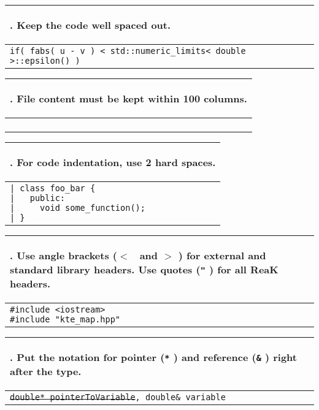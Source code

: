 \documentclass[10pt]{article}
\newcommand{\code}[1]{\color[rgb]{0.2,0.8,0.2}\texttt{#1}\color[rgb]{0,0,0} }
\newcounter {iCommandment}
\newcommand{\CorG}[5]
{
\begin{table}[H]
\begin{center}
\begin{tabular}{| p{12cm} |}
\hline
#1. #2 \\
\hline
\vspace{-0.1cm}
\parbox{12cm}{\code{#3}} \\
\vspace{-0.2cm}
#4 \\
#5 \\
\hline
\end{tabular}
\end{center}
\end{table}
}
\newcommand{\Commandment}[4]
{
\CorG{\textbf{\arabic{iCommandment}}\addtocounter{iCommandment}{1}}
{\textbf{#1}}{#2}{#3}{#4}
}
\begin{document}
\Commandment
{Keep the code well spaced out.}
{if( fabs( u - v ) < std::numeric\_limits< double >::epsilon() )}
{Code needs to be easy to read, it doesn't have to occupy the minimum number of lines or jam as much 
instructions in the least amount of space. Try to leave an empty space between operators and operands, 
between parentheses and their content, between parameters, and so on. Also, in the view that code should 
be readable like prose, well, prose is usually separated into paragraphs, it's the same thing in 
programming, i.e., leave empty lines to logically separate groups of instructions (and ideally add a comment 
at the start of each such group of instructions).}
{\ }

\Commandment
{File content must be kept within 100 columns.}
{\ }
{It improves readability when you do not have to scroll sideways.}
{}

\Commandment
{For code indentation, use 2 hard spaces. }
{|\ class foo\_bar \{\\
|\ \ \ public:\\
|\ \ \ \ \ void some\_function();\\
|\ \}
}
{Tabs should not be used, as they can give different behavior in different editors. Most editors can be set 
such that each tab is replaced by 4 or 8 spaces. Everything in ReaK should be indented properly, with 2 spaces for 
each level of indentation, except for namespace scopes that don't require indentation.}
{\ }

\Commandment
{Use angle brackets (\code{$<$}\ and \code{$>$}) for external and standard library headers. Use 
quotes (\code{"}) for all ReaK headers.}
{\#include <iostream> \\ \#include "kte\_map.hpp"}
{It is important to distinguish the two forms of \code{\#include}\ directive not only for documentation 
purposes but also for portability. The quote-version tells the compilers to first look in the ReaK library's 
folders for the given header file, while the bracket-version tells the compiler not to look in the ReaK library's 
folders but only in the external include paths and the system include directories (with standard and system libraries).}
{\ }

\Commandment
{Put the notation for pointer (\code{*}) and reference (\code{\&}) right after the type. }
{\sout{double* pointerToVariable}, double\& variable }
{In this way, it is more clear which type it points/references to. This is a pretty basic guideline but it is included 
here because it is a good habit to have.}
{\ }
\end{document}
